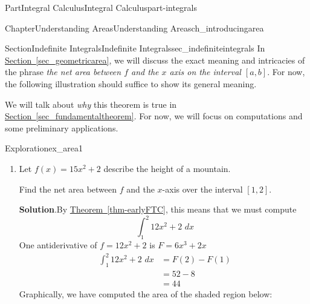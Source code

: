 \documentclass[oneside,10pt,]{tufte-book}
\newcommand{\blocktitlefont}{\relax}
\newcommand{\xreffont}{\relax}
\numberwithin{equation}{chapter}
\newcommand{\intdx}[1]{{\,\int#1\,\,dx}}
\newcommand{\amp}{&}
\begin{document}
\begin{partptx}{Part}{Integral Calculus}{}{Integral Calculus}{}{}{part-integrals}
\begin{chapterptx}{Chapter}{Understanding Areas}{}{Understanding Areas}{}{}{ch_introducingarea}
\begin{sectionptx}{Section}{Indefinite Integrals}{}{Indefinite Integrals}{}{}{sec_indefiniteintegrals}
In \hyperref[sec_geometricarea]{Section~{\xreffont\ref{sec_geometricarea}}}, we will discuss the exact meaning and intricacies of the phrase \emph{the net area between \(f\) and the \(x\) axis on the interval \([a,b]\)}. For now, the following illustration should suffice to show its general meaning.%
\begin{image}{0.25}{0.5}{0.25}{}%
%
\end{image}%
We will talk about \emph{why} this theorem is true in \hyperref[sec_fundamentaltheorem]{Section~{\xreffont\ref{sec_fundamentaltheorem}}}.  For now, we will focus on computations and some preliminary applications.%
\begin{exploration}{Exploration}{}{ex_area1}%
\begin{enumerate}[font=\bfseries,label=(\alph*),ref=\alph*]%
\item{}Let \(f(x) = 15x^2 + 2\) describe the height of a mountain.%
\par
Find the net area between \(f\) and the \(x\)-axis over the interval \([1,2]\).%
\par\smallskip%
\noindent\textbf{\blocktitlefont Solution}.\hypertarget{ex_area1-1-2}{}\quad{}By \hyperref[thm-earlyFTC]{Theorem~{\xreffont\ref{thm-earlyFTC}}}, this means that we must compute%
\begin{equation*}
\intdx{_1^2  12x^2 + 2 }
\end{equation*}
One antiderivative of \(f=12x^2 + 2\) is \(F=6x^3 + 2x\)%
\begin{align*}
\intdx{_1^2  12x^2 + 2 } \amp = F(2)-F(1)\\
\amp = 52 - 8 \\
\amp = 44     
\end{align*}
Graphically, we have computed the area of the shaded region below:%
\begin{image}{0.25}{0.5}{0.25}{}%

\end{image}
\end{enumerate}
\end{exploration}
\end{sectionptx}
\end{chapterptx}
\end{partptx}
\end{document}
